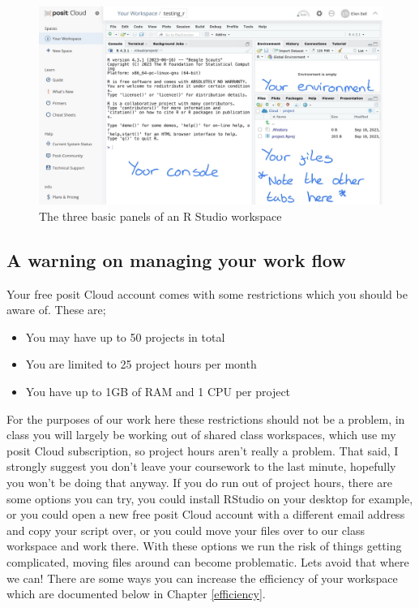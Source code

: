 \documentclass[
]{book}
\providecommand{\tightlist}{%
  \setlength{\itemsep}{0pt}\setlength{\parskip}{0pt}}
\begin{document}
\begin{figure}
\includegraphics[width=0.9\linewidth]{figures/posit4} \caption{The three basic panels of an R Studio workspace}\label{fig:unnamed-chunk-4}
\end{figure}

\subsection{A warning on managing your work flow}\label{a-warning-on-managing-your-work-flow}

Your free posit Cloud account comes with some restrictions which you should be aware of. These are;

\begin{itemize}
\tightlist
\item
  You may have up to 50 projects in total
\item
  You are limited to 25 project hours per month
\item
  You have up to 1GB of RAM and 1 CPU per project
\end{itemize}

For the purposes of our work here these restrictions should not be a problem, in class you will largely be working out of shared class workspaces, which use my posit Cloud subscription, so project hours aren't really a problem. That said, I strongly suggest you don't leave your coursework to the last minute, hopefully you won't be doing that anyway. If you do run out of project hours, there are some options you can try, you could install RStudio on your desktop for example, or you could open a new free posit Cloud account with a different email address and copy your script over, or you could move your files over to our class workspace and work there. With these options we run the risk of things getting complicated, moving files around can become problematic. Lets avoid that where we can! There are some ways you can increase the efficiency of your workspace which are documented below in Chapter \ref{efficiency}.
\end{document}
